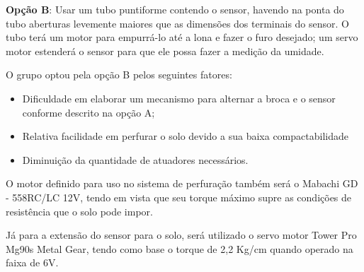  \textbf{Opção B}: Usar um tubo puntiforme contendo o sensor, havendo na ponta do tubo
  aberturas levemente maiores que as dimensões dos terminais do sensor. O tubo
  terá um motor para empurrá-lo até a lona e fazer o furo desejado; um servo
  motor estenderá o sensor para que ele possa fazer a medição da umidade.

  O grupo optou pela opção B pelos seguintes fatores:

  \begin{itemize}
    \item Dificuldade em elaborar um mecanismo para alternar a broca e o sensor
    conforme descrito na opção A;
    \item Relativa facilidade em perfurar o solo devido a sua baixa compactabilidade
    \item Diminuição da quantidade de atuadores necessários.
  \end{itemize}

  O motor definido para uso no sistema de perfuração também será o
  Mabachi GD - 558RC/LC 12V, tendo em vista que seu torque máximo supre as
  condições de resistência que o solo pode impor.

  Já para a extensão do sensor para o solo, será utilizado o servo motor Tower
  Pro Mg90s Metal Gear, tendo como base o torque de 2,2 Kg/cm quando operado na faixa de 6V.
